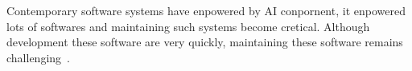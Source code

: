 \documentclass[acmsmall,screen,review,anonymous]{acmart}
\begin{document}
Contemporary software systems have enpowered by AI conpornent, it enpowered lots of softwares and maintaining such systems become cretical. Although development these software are very quickly, maintaining these software remains challenging~\cite{sculley2015hidden}. 
















\end{document}
